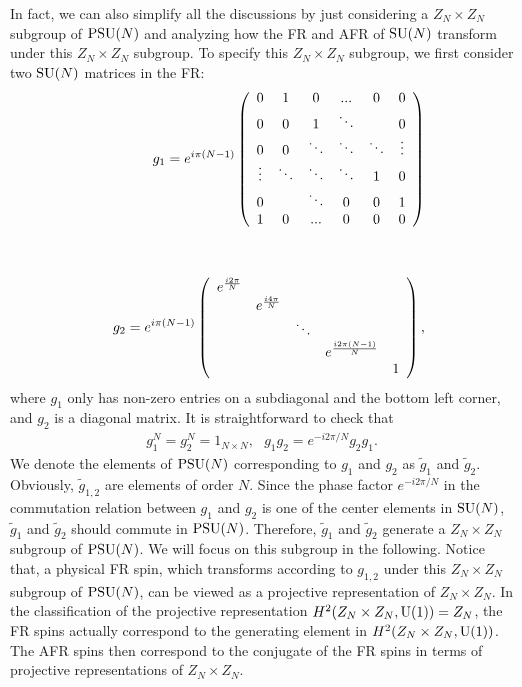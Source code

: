 \documentclass[aps,prb,twocolumn,superscriptaddress,showpacs]{revtex4}
\newcommand{\SU}{\mathrm{SU}}
\newcommand{\U}{\mathrm{U}}
\newcommand{\beqn}{\begin{eqnarray}}
\newcommand{\eeqn}{\end{eqnarray}}
\def\SU{{\rm SU}}
\def\PSU{{\rm PSU}}
\def\U{{\rm U}}
\begin{document}
In fact, we can also simplify all the discussions by just
considering a $Z_N \times Z_N$ subgroup of $\PSU(N)$ and analyzing
how the FR and AFR of $\SU(N)$ transform under this $Z_N \times
Z_N$ subgroup. To specify this $Z_N \times Z_N$ subgroup, we first
consider two $\SU(N)$ matrices in the FR: \beqn && g_1 = e^{i \pi
(N-1)} \left(
\begin{array}{ccccccc}
0 & 1 & 0 & ... & 0 & 0 \\
0 & 0 & 1 & \ddots &  & 0  \\
0 & 0 & \ddots & \ddots &  \ddots & \vdots  \\
 \vdots & \ddots &  \ddots & \ddots  & 1 & 0  \\
0 &   &  \ddots &  0 & 0 & 1  \\
1 & 0 & ... & 0 & 0 & 0  \\
\end{array}
\right) \cr\cr\cr && g_2 = e^{i \pi (N-1)} \left(
\begin{array}{ccccccc}
e^{\frac{i 2\pi}{N}} &  & &  &   \\
 & e^{\frac{i 4\pi}{N}} & &  &    \\
 & & \ddots & & \\
& & & e^{\frac{i 2\pi(N-1)}{N}}  &   \\
& & & & 1  \\
\end{array}
\right), \label{Eq:LSM_Zn_Proj_Gen} \eeqn where $g_1$ only has non-zero
entries on a subdiagonal and the bottom left corner, and $g_2$ is
a diagonal matrix. It is straightforward to check that
\begin{align}
g_1^N = g_2^N = 1_{N \times N}, \ \ \ g_1 g_2 = e^{-i 2\pi /N} g_2
g_1.
\end{align}
We denote the elements of $\PSU(N)$ corresponding to $g_1$ and
$g_2$ as $\tilde{g}_1$ and $\tilde{g}_2$. Obviously,
$\tilde{g}_{1,2}$ are elements of order $N$. Since the phase
factor $e^{-i 2\pi /N} $ in the commutation relation between $g_1$
and $g_2$ is one of the center elements in $\SU(N)$,
$\tilde{g}_{1}$ and $\tilde{g}_{2}$ should commute in $\PSU(N)$.
Therefore, $\tilde{g}_1$ and $\tilde{g}_2$ generate a $Z_N \times
Z_N$ subgroup of $\PSU(N)$. We will focus on this subgroup in the
following. Notice that, a physical FR spin, which transforms
according to $g_{1,2}$ under this $Z_N \times Z_N$ subgroup of
$\PSU(N)$, can be viewed as a projective representation of $Z_N
\times Z_N$. In the classification of the projective
representation $H^2(Z_N \times Z_N, \U(1)) = Z_N$, the FR spins
actually correspond to the generating element in $H^2(Z_N \times
Z_N, \U(1))$. The AFR spins then correspond to the conjugate of
the FR spins in terms of projective representations of $Z_N \times
Z_N$.
\end{document}
